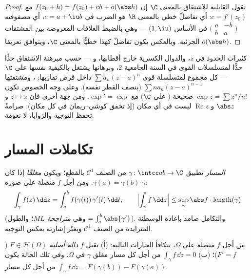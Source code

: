 \begin{proof}
تقول القابلية للاشتقاق بالمعنى $\C$ إن $f(z_0 + h) = f(z_0) + ch +
o(\abs h)$ مع $c = f'(z_0)$:
أي تفاضلٌ خطي بالمعنى $\R$ هو الضرب في $c = a + \iu b$، أي
مصفوفته $\bigl(\begin{smallmatrix} a & -b\\ b & a
\end{smallmatrix}\bigr)$ في الأساس $(1, \iu)$ --- وهي بالضبط العلاقات
المعروضة بين المشتقات الجزئية. وبالعكس يكون تفاضلٌ كهذا خطيًّا
بالمعنى $\C$، ويتوافق تعريفا $o(\abs h)$.
\end{proof}

\begin{example}\label{ex:b3:holomorphic:examples}
كثيرات الحدود في $z$، والدوال الكسرية خارج أقطابها، و --- حسب
مبرهنة الاشتقاق حدًّا حدًّا لمتسلسلات القوى في السنة الجامعية
2، وبرهانها يشتغل بالكيفية نفسها على $\C$ --- كل مجموع لمتسلسلة
قوى $\sum a_n(z - a)^n$ داخل قرص تقاربها: ، ومشتقتها $\sum na_n(z -
a)^{n-1}$
(بنصف القطر نفسه). وعلى وجه الخصوص تكون $\exp z = \sum z^n/n!$ صحيحة
( على $\C$) مع $\exp' = \exp$. ومن جهة أخرى فإن
$z \mapsto \bar z$ و $\abs z$ و $\operatorname{Re}z$ ليست  في أي مكان (إذ تخفق
كوشي--ريمان في كل مكان):  صرامةٌ تحفظ التوجيه
والزوايا، لا نعومة.
\end{example}

\section{تكاملات المسار}

\begin{definition}\label{def:b3:holomorphic:contour}
\emph{المسار} تطبيق $\gamma \colon
\intcc ab \to \C$ من الصنف $\mathcal C^1$ بالقطع؛
ويكون \emph{مغلقًا} إذا كان $\gamma(a) =
\gamma(b)$. ومن أجل $f$ متصلة على صورة
$\gamma$:
\[
\int_\gamma f(z)\,\dd z =
\int_a^b f(\gamma(t))\,\gamma'(t)\,\dd t,
\qquad
\Bigl|\int_\gamma f\,\dd z\Bigr| \leq
\sup_{\gamma}\abs f\cdot\operatorname{length}(\gamma)
\]
(وهي \emph{متراجحة $ML$}؛ والطول $= \int_a^b\abs{\gamma'}$). والتكامل صامد بإعادة
الوسطنة المتزايدة من الصنف $\mathcal C^1$ ويغيّر إشارته بعكس
التوجيه.
\end{definition}

\begin{proposition}\label{prop:b3:holomorphic:primitive}
من أجل $f$ متصلة على $\Omega$، تتكافأ العبارات التالية:
(أ) تقبل $f$ \emph{دالة أصلية} $F \in \mathcal H(\Omega)$ ($F'
= f$)؛ (ب) $\int_\gamma f\,\dd z = 0$ من أجل
كل مسار مغلق $\gamma$ في $\Omega$. وفي تلك الحالة يكون $\int_\gamma f\,\dd z =
F(\gamma(b)) - F(\gamma(a))$
من أجل كل مسار.
\end{proposition}

